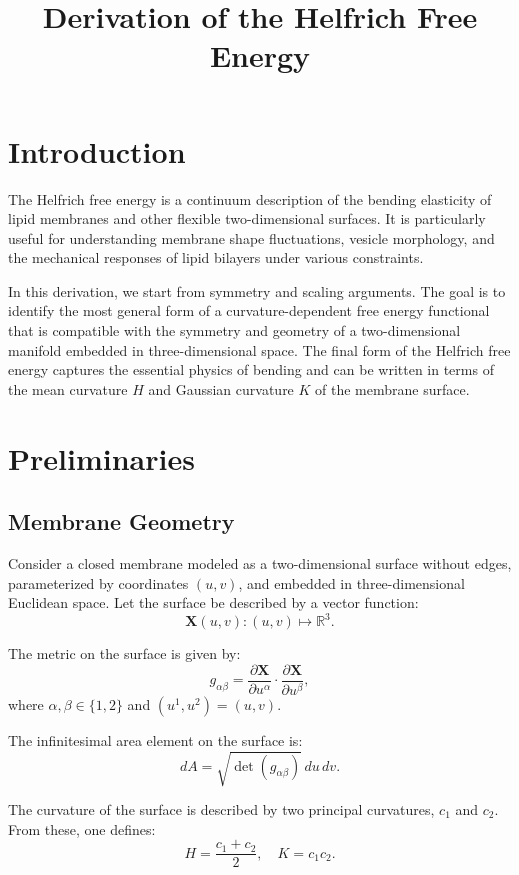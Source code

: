 \documentclass[12pt,a4paper]{article}
\begin{document}
\title{Derivation of the Helfrich Free Energy}
\author{}
\date{}
\maketitle

\section{Introduction}

The Helfrich free energy is a continuum description of the bending elasticity of lipid membranes and other flexible two-dimensional surfaces. It is particularly useful for understanding membrane shape fluctuations, vesicle morphology, and the mechanical responses of lipid bilayers under various constraints.

In this derivation, we start from symmetry and scaling arguments. The goal is to identify the most general form of a curvature-dependent free energy functional that is compatible with the symmetry and geometry of a two-dimensional manifold embedded in three-dimensional space. The final form of the Helfrich free energy captures the essential physics of bending and can be written in terms of the mean curvature $H$ and Gaussian curvature $K$ of the membrane surface.

\section{Preliminaries}

\subsection{Membrane Geometry}

Consider a closed membrane modeled as a two-dimensional surface without edges, parameterized by coordinates $(u,v)$, and embedded in three-dimensional Euclidean space. Let the surface be described by a vector function:
\[
\mathbf{X}(u,v) : (u,v) \mapsto \mathbb{R}^3.
\]

The metric on the surface is given by:
\[
g_{\alpha\beta} = \frac{\partial \mathbf{X}}{\partial u^\alpha} \cdot \frac{\partial \mathbf{X}}{\partial u^\beta},
\]
where $\alpha,\beta \in \{1,2\}$ and $(u^1,u^2) = (u,v)$.

The infinitesimal area element on the surface is:
\[
dA = \sqrt{\det(g_{\alpha\beta})} \, du \, dv.
\]

The curvature of the surface is described by two principal curvatures, $c_1$ and $c_2$. From these, one defines:
\[
H = \frac{c_1 + c_2}{2}, \quad K = c_1 c_2.
\]
\end{document}

